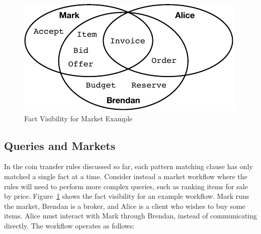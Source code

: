 


\begin{figure}
\begin{center}
\includegraphics{figure/auction-visibility.pdf}
\end{center}
\vspace{-2ex}
\caption{Fact Visibility for Market Example}
\label{f:AuctionVisibility}
\end{figure}


\subsection{Queries and Markets}
\label{s:Query}
In the coin transfer rules discussed so far, each pattern matching clause has only matched a single fact at a time. Consider instead a market workflow where the rules will need to perform more complex queries, such as ranking items for sale by price. Figure~\ref{f:AuctionVisibility} shows the fact visibility for an example workflow. Mark runs the market, Brendan is a broker, and Alice is a client who wishes to buy some items. Alice must interact with Mark through Brendan, instead of communicating directly. The workflow operates as follows:

